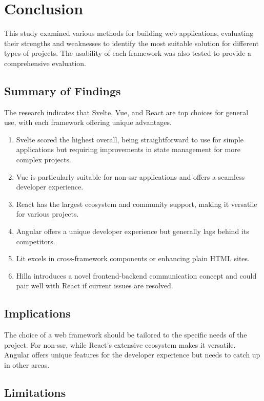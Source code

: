 \chapter{Conclusion}

This study examined various methods for building web applications, evaluating their strengths and weaknesses to identify the most suitable solution for different types of projects. The usability of each framework was also tested to provide a comprehensive evaluation.

\section{Summary of Findings}

The research indicates that Svelte, Vue, and React are top choices for general use, with each framework offering unique advantages.

\begin{enumerate}
    \item Svelte scored the highest overall, being straightforward to use for simple applications but requiring improvements in state management for more complex projects.
    \item Vue is particularly suitable for non-\acrshort{ssr} applications and offers a seamless developer experience.
    \item React has the largest ecosystem and community support, making it versatile for various projects.
    \item Angular offers a unique developer experience but generally lags behind its competitors.
    \item Lit excels in cross-framework components or enhancing plain HTML sites.
    \item Hilla introduces a novel frontend-backend communication concept and could pair well with React if current issues are resolved.
\end{enumerate}

\section{Implications}

The choice of a web framework should be tailored to the specific needs of the project. For non-\acrshort{ssr}, while React's extensive ecosystem makes it versatile. Angular offers unique features for the developer experience but needs to catch up in other areas.

\section{Limitations}


